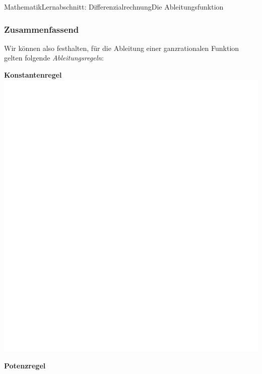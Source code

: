 \documentclass[11pt,twocolumn,oneside,openany,headings=optiontotoc,11pt,numbers=noenddot]{article}
\begin{document}
\begin{worksheet}{Mathematik}{Lernabschnitt: Differenzialrechnung}{Die Ableitungsfunktion}
		\subsubsection{Zusammenfassend}
		Wir können also festhalten, für die Ableitung einer ganzrationalen Funktion gelten folgende \textit{Ableitungsregeln}:\\
		\par
		\textbf{Konstantenregel}\\
		\includegraphics[scale=0.1]{../../empty.jpg}\\
		\par
		\textbf{Potenzregel}\\

\end{worksheet}
\end{document}
